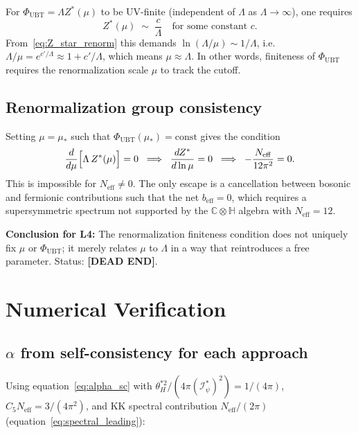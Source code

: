 \documentclass[11pt,a4paper]{article}
\theoremstyle{definition}
\theoremstyle{remark}
\begin{document}
For $\Phi_{\mathrm{UBT}} = \Lambda Z^*(\mu)$ to be UV-finite
(independent of $\Lambda$ as $\Lambda\to\infty$), one requires
\begin{equation}
  Z^*(\mu) \;\sim\; \frac{c}{\Lambda}
  \quad\text{for some constant } c.
\end{equation}
From~\eqref{eq:Z_star_renorm} this demands
$\ln(\Lambda/\mu) \sim 1/\Lambda$, i.e.\
$\Lambda/\mu = e^{c'\!/\Lambda}\approx 1 + c'/\Lambda$,
which means $\mu \approx \Lambda$.
In other words, finiteness of $\Phi_{\mathrm{UBT}}$ requires the
renormalization scale $\mu$ to track the cutoff.

\subsection{Renormalization group consistency}

Setting $\mu = \mu_*$ such that $\Phi_{\mathrm{UBT}}(\mu_*) = \mathrm{const}$
gives the condition
\begin{equation}
  \frac{d}{d\mu}\Bigl[\Lambda\,Z^*(\mu)\Bigr] = 0
  \;\;\Longrightarrow\;\;
  \frac{d Z^*}{d\ln\mu} = 0
  \;\;\Longrightarrow\;\;
  -\frac{N_{\mathrm{eff}}}{12\pi^2} = 0.
  \label{eq:finiteness_impossible}
\end{equation}
This is impossible for $N_{\mathrm{eff}}\neq 0$.
The only escape is a cancellation between bosonic and fermionic
contributions such that the net $b_{\mathrm{eff}} = 0$,
which requires a supersymmetric spectrum not supported by the
$\mathbb{C}\otimes\mathbb{H}$ algebra with $N_{\mathrm{eff}} = 12$.

\textbf{Conclusion for L4:}
The renormalization finiteness condition does not uniquely fix $\mu$
or $\Phi_{\mathrm{UBT}}$; it merely relates $\mu$ to $\Lambda$ in a way
that reintroduces a free parameter.
Status: \textbf{[DEAD END]}.

\section{Numerical Verification}
\label{sec:numerical}

\subsection{$\alpha$ from self-consistency for each approach}

Using equation~\eqref{eq:alpha_sc} with
$\theta_H^{*2}/(4\pi(\mathcal{I}_\psi^*)^2) = 1/(4\pi)$,
$C_5 N_{\mathrm{eff}} = 3/(4\pi^2)$, and KK spectral contribution
$N_{\mathrm{eff}}/(2\pi)$ (equation~\eqref{eq:spectral_leading}):
\end{document}

